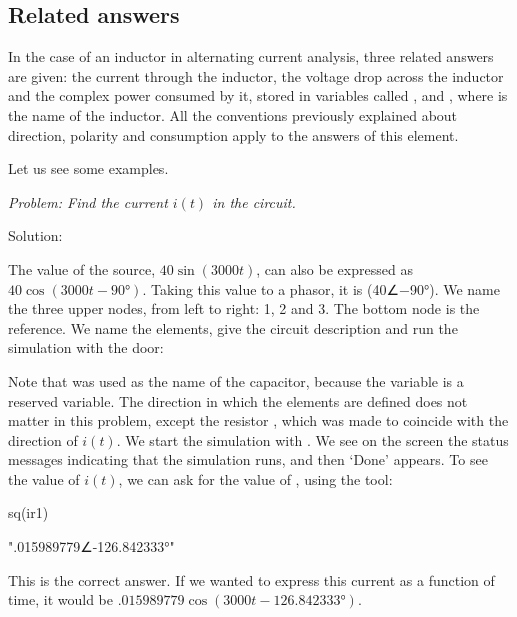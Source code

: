 \subsection{Related answers}

In the case of an inductor in alternating current analysis, three
related answers are given: the current through the inductor, the
voltage drop across the inductor and the complex power consumed by
it, stored in variables called ,  and
, where  is the name of the inductor. All the
conventions previously explained about direction, polarity and
consumption apply to the answers of this element.

Let us see some examples.


\emph{Problem: Find the current $i(t)$ in the circuit.}

Solution:

The value of the source, $40\sin(3000t)$, can also be expressed as
$40\cos(3000t - 90°)$. Taking this value to a phasor, it is
(40∠$-$90°). We name the three upper nodes, from left to right: 1, 2
and 3. The bottom node is the reference. We name the elements, give
the circuit description and run the simulation with the
 door:


Note that  was used as the name of the capacitor, because
the variable  is a reserved variable. The direction in
which the elements are defined does not matter in this problem,
except the resistor , which was made to coincide with the
direction of $i(t)$. We start the simulation with . We
see on the screen the status messages indicating that the simulation
runs, and then `Done' appears. To see the value of $i(t)$, we can
ask for the value of , using the  tool:

\begin{entry}
sq\absang(ir1)
\end{entry}

\begin{entry}
".015989779∠-126.842333°"
\end{entry}

This is the correct answer. If we wanted to express this current as
a function of time, it would be
$.015989779\cos(3000t - 126.842333°)$.

